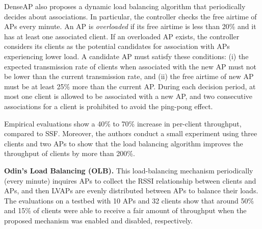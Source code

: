 DenseAP also proposes a dynamic load balancing algorithm that periodically decides about associations.
In particular, the controller checks the free airtime of APs every minute. 
An AP is \textit{overloaded} if its free airtime is less than 20\% and it has at least one associated client. 
If an overloaded AP exists, the controller considers its clients as the potential candidates for association with APs experiencing lower load.
A candidate AP must satisfy these conditions: 
(i) the expected transmission rate of clients when associated with the new AP must not be lower than the current transmission rate, and (ii) the free airtime of new AP must be at least 25\% more than the current AP. 
During each decision period, at most one client is allowed to be associated with a new AP, and two consecutive associations for a client is prohibited to avoid the ping-pong effect.

Empirical evaluations show a 40\% to 70\% increase in per-client throughput, compared to SSF. 
Moreover, the authors conduct a small experiment using three clients and two APs to show that the load balancing algorithm improves the throughput of clients by more than 200\%. 



\textbf{Odin's Load Balancing (OLB).}
This load-balancing mechanism \cite{Odin2} periodically (every minute) inquires APs to collect the RSSI relationship between clients and APs, and then LVAPs are evenly distributed between APs to balance their loads.
The evaluations on a testbed with 10 APs and 32 clients show that around 50\% and 15\% of clients were able to receive a fair amount of throughput when the proposed mechanism was enabled and disabled, respectively.



